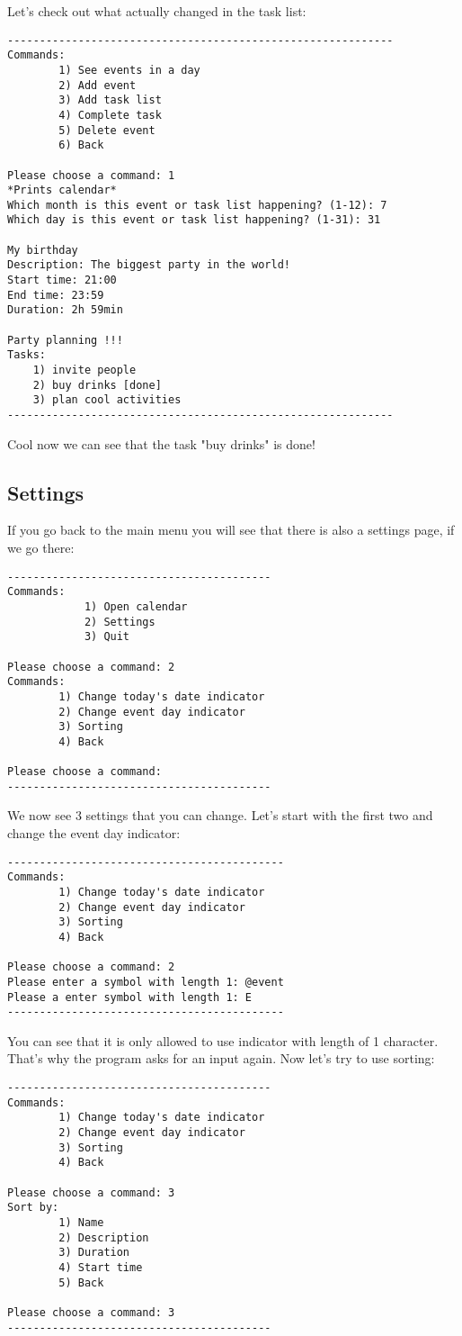 \documentclass[a4paper, 12pt]{article}
\begin{document}
Let's check out what actually changed in the task list:
\begin{verbatim}
------------------------------------------------------------
Commands:
        1) See events in a day
        2) Add event
        3) Add task list
        4) Complete task
        5) Delete event
        6) Back
                    
Please choose a command: 1
*Prints calendar*
Which month is this event or task list happening? (1-12): 7
Which day is this event or task list happening? (1-31): 31

My birthday
Description: The biggest party in the world!
Start time: 21:00
End time: 23:59
Duration: 2h 59min

Party planning !!!
Tasks: 
	1) invite people
	2) buy drinks [done]
	3) plan cool activities
------------------------------------------------------------
\end{verbatim}
Cool now we can see that the task "buy drinks" is done!

    \subsection{Settings}
If you go back to the main menu you will see that there is also a settings page, if we go there:
\begin{verbatim}
-----------------------------------------
Commands:
            1) Open calendar
            2) Settings
            3) Quit
            
Please choose a command: 2
Commands:
        1) Change today's date indicator
        2) Change event day indicator
        3) Sorting
        4) Back
                    
Please choose a command: 
-----------------------------------------
\end{verbatim}        

We now see 3 settings that you can change. Let's start with the first two and change the event day indicator:
\begin{verbatim}
-------------------------------------------
Commands:
        1) Change today's date indicator
        2) Change event day indicator
        3) Sorting
        4) Back

Please choose a command: 2
Please enter a symbol with length 1: @event
Please a enter symbol with length 1: E
-------------------------------------------
\end{verbatim}     
You can see that it is only allowed to use indicator with length of 1 character. That's why the program asks for an input again. Now let's try to use sorting:
\begin{verbatim}
-----------------------------------------
Commands:
        1) Change today's date indicator
        2) Change event day indicator
        3) Sorting
        4) Back
                    
Please choose a command: 3
Sort by:
        1) Name
        2) Description
        3) Duration
        4) Start time
        5) Back
                    
Please choose a command: 3
-----------------------------------------
\end{verbatim}
    
\end{document}
